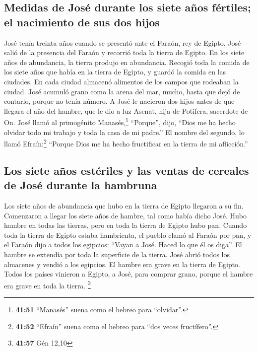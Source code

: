 \begin{paracol}{2}
\hypertarget{medidas-de-josuxe9-durante-los-siete-auxf1os-fuxe9rtiles-el-nacimiento-de-sus-dos-hijos}{%
\subsection{Medidas de José durante los siete años fértiles; el
nacimiento de sus dos
hijos}\label{medidas-de-josuxe9-durante-los-siete-auxf1os-fuxe9rtiles-el-nacimiento-de-sus-dos-hijos}}

 José tenía treinta años cuando se presentó ante el
Faraón, rey de Egipto. José salió de la presencia del Faraón y recorrió
toda la tierra de Egipto.  En los siete años de
abundancia, la tierra produjo en abundancia.  Recogió
toda la comida de los siete años que había en la tierra de Egipto, y
guardó la comida en las ciudades. En cada ciudad almacenó alimentos de
los campos que rodeaban la ciudad.  José acumuló grano
como la arena del mar, mucho, hasta que dejó de contarlo, porque no
tenía número.  A José le nacieron dos hijos antes de que
llegara el año del hambre, que le dio a luz Asenat, hija de Potifera,
sacerdote de On.  José llamó al primogénito
Manasés,\footnote{\textbf{41:51} ``Manasés'' suena como el hebreo para
  ``olvidar''.} ``Porque'', dijo, ``Dios me ha hecho olvidar todo mi
trabajo y toda la casa de mi padre.''  El nombre del
segundo, lo llamó Efraín:\footnote{\textbf{41:52} ``Efraín'' suena como
  el hebreo para ``dos veces fructífero''.} ``Porque Dios me ha hecho
fructificar en la tierra de mi aflicción.''

\hypertarget{los-siete-auxf1os-estuxe9riles-y-las-ventas-de-cereales-de-josuxe9-durante-la-hambruna}{%
\subsection{Los siete años estériles y las ventas de cereales de José
durante la
hambruna}\label{los-siete-auxf1os-estuxe9riles-y-las-ventas-de-cereales-de-josuxe9-durante-la-hambruna}}

 Los siete años de abundancia que hubo en la tierra de
Egipto llegaron a su fin.  Comenzaron a llegar los siete
años de hambre, tal como había dicho José. Hubo hambre en todas las
tierras, pero en toda la tierra de Egipto hubo pan. 
Cuando toda la tierra de Egipto estaba hambrienta, el pueblo clamó al
Faraón por pan, y el Faraón dijo a todos los egipcios: ``Vayan a José.
Haced lo que él os diga''.  El hambre se extendía por
toda la superficie de la tierra. José abrió todos los almacenes y vendió
a los egipcios. El hambre era grave en la tierra de Egipto.
 Todos los países vinieron a Egipto, a José, para comprar
grano, porque el hambre era grave en toda la tierra. \footnote{\textbf{41:57}
  Gén 12,10}


\end{paracol}
